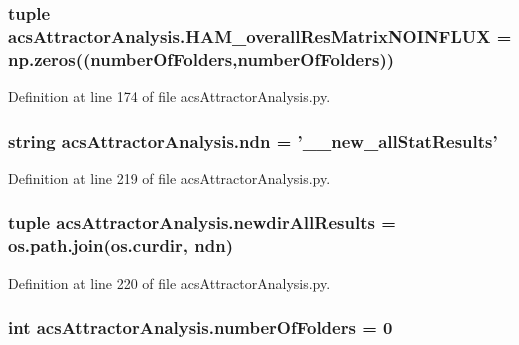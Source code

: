\hypertarget{a00096_a9aa1adb46370d97e4f38e7f09eb7a97c}{
\subsubsection[{H\-A\-M\-\_\-overall\-Res\-Matrix\-N\-O\-I\-N\-F\-L\-U\-X}]{\setlength{\rightskip}{0pt plus 5cm}tuple acs\-Attractor\-Analysis.\-H\-A\-M\-\_\-overall\-Res\-Matrix\-N\-O\-I\-N\-F\-L\-U\-X = np.\-zeros(({\bf number\-Of\-Folders},{\bf number\-Of\-Folders}))}}\label{a00096_a9aa1adb46370d97e4f38e7f09eb7a97c}


Definition at line 174 of file acs\-Attractor\-Analysis.\-py.

\hypertarget{a00096_a109ce3a379d650b3f9b08debc0433a19}{
\subsubsection[{ndn}]{\setlength{\rightskip}{0pt plus 5cm}string acs\-Attractor\-Analysis.\-ndn = '\-\_\-\_\-new\-\_\-all\-Stat\-Results'}}\label{a00096_a109ce3a379d650b3f9b08debc0433a19}


Definition at line 219 of file acs\-Attractor\-Analysis.\-py.

\hypertarget{a00096_ae620f985669aed90dc070824420d4b5e}{
\subsubsection[{newdir\-All\-Results}]{\setlength{\rightskip}{0pt plus 5cm}tuple acs\-Attractor\-Analysis.\-newdir\-All\-Results = os.\-path.\-join(os.\-curdir, {\bf ndn})}}\label{a00096_ae620f985669aed90dc070824420d4b5e}


Definition at line 220 of file acs\-Attractor\-Analysis.\-py.

\hypertarget{a00096_aa5d2495d08b8ad5ebf34f85d5417e93c}{
\subsubsection[{number\-Of\-Folders}]{\setlength{\rightskip}{0pt plus 5cm}int acs\-Attractor\-Analysis.\-number\-Of\-Folders = 0}}\label{a00096_aa5d2495d08b8ad5ebf34f85d5417e93c}


